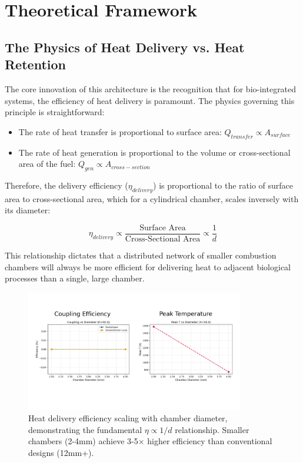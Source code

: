 \section{Theoretical Framework}
\label{sec:theory}

\subsection{The Physics of Heat Delivery vs. Heat Retention}

The core innovation of this architecture is the recognition that for bio-integrated systems, the efficiency of heat delivery is paramount. The physics governing this principle is straightforward:

\begin{itemize}
    \item The rate of heat transfer is proportional to surface area: $Q_{transfer} \propto A_{surface}$
    \item The rate of heat generation is proportional to the volume or cross-sectional area of the fuel: $Q_{gen} \propto A_{cross-section}$
\end{itemize}

Therefore, the delivery efficiency ($\eta_{delivery}$) is proportional to the ratio of surface area to cross-sectional area, which for a cylindrical chamber, scales inversely with its diameter:

\begin{equation}
    \eta_{delivery} \propto \frac{\text{Surface Area}}{\text{Cross-Sectional Area}} \propto \frac{1}{d}
    \label{eq:efficiency_scaling}
\end{equation}

This relationship dictates that a distributed network of smaller combustion chambers will always be more efficient for delivering heat to adjacent biological processes than a single, large chamber.

\begin{figure}[H]
    \centering
    \includegraphics[width=0.85\textwidth]{figures/simulations/fig_heat_scaling_DEV_CYCLE_4.png}
    \caption{Heat delivery efficiency scaling with chamber diameter, demonstrating the fundamental $\eta \propto 1/d$ relationship. Smaller chambers (2-4mm) achieve 3-5× higher efficiency than conventional designs (12mm+).}
    \label{fig:heat_scaling}
\end{figure}

